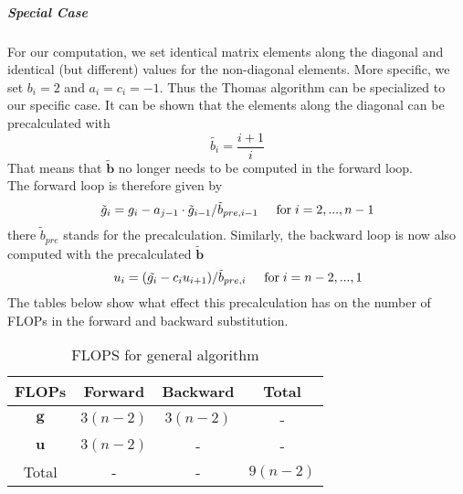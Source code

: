 \documentclass[%
oneside,                 %
final,                   %
10pt]{article}
\begin{document}
\subparagraph{Special Case}
For our computation, we set identical matrix elements along the diagonal and identical (but different) values for the non-diagonal elements. More specific, we set $b_i = 2$ and $a_i = c_i = -1$. Thus the Thomas algorithm can be specialized to our specific case. It can be shown that the elements along the diagonal can be precalculated with
\begin{equation*}
\tilde{b_i} = \frac{i+1}{i}
\end{equation*}
That means that $\mathbf{\tilde{b}}$ no longer needs to be computed in the forward loop. \\
The forward loop is therefore given by
\begin{equation*}
\tilde{g}_i = g_i - a_{j-1} \cdot \tilde{g}_{i-1} / \tilde{b}_{pre, i-1}  \hspace{0.5cm} \mathrm{for} \hspace{0.1cm} i=2,..., n-1 \\
\end{equation*}
there $\tilde{b}_{pre}$ stands for the precalculation.
Similarly, the backward loop is now also computed with the precalculated $\mathbf{\tilde{b}}$
\begin{equation*}
u_i = ( \tilde{g_i}-c_i u_{i+1} )/ \tilde{b}_{pre,i} \hspace{0.5cm} \mathrm{for} \hspace{0.1cm} i=n-2,...,1 
\end{equation*}
The tables below show what effect this precalculation has on the number of FLOPs in the forward and backward substitution.

\begin{table}[ht]
\caption{FLOPS for general algorithm}
\centering
	\begin{tabular}{c c c c}
		\hline
		FLOPs   & Forward & Backward & Total \\ [0.5ex]
		\hline
		$\mathbf{g}$ & $3 (n-2)$       & $3 (n-2)$        & -    \\
        	$\mathbf{u}$ & $3 (n-2)$       & -        & -     \\
        	Total        & -       & -        &  $9 (n-2)$      \\ [1ex]
		\hline
	\end{tabular}
\end{table}	
\end{document}
